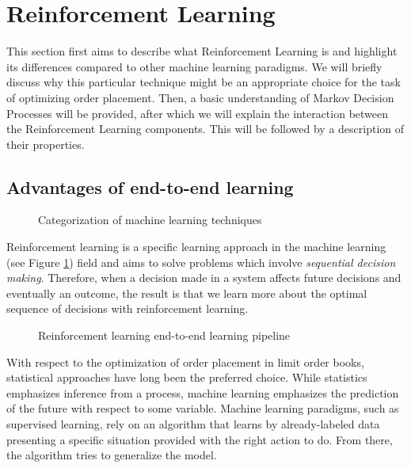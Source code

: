 \section{Reinforcement Learning}
\label{sec:reinforcement-learning}

This section first aims to describe what Reinforcement Learning is and highlight its differences compared to other machine learning paradigms. 
We will briefly discuss why this particular technique might be an appropriate choice for the task of optimizing order placement. 
Then, a basic understanding of Markov Decision Processes will be provided, after which we will explain the interaction between the Reinforcement Learning components. This will be followed by a description of their properties.

\subsection{Advantages of end-to-end learning}

\begin{figure}[H]
    \centering
    \caption{Categorization of machine learning techniques}
    \label{fig:ml-rl}
\end{figure}

Reinforcement learning is a specific learning approach in the machine learning (see Figure \ref{fig:ml-rl}) field and aims to solve problems which involve \textit{sequential decision making}.
Therefore, when a decision made in a system affects future decisions and eventually an outcome, the result is that we learn more about the optimal sequence of decisions with reinforcement learning.

\begin{figure}[H]
    \centering
    \caption{Reinforcement learning end-to-end learning pipeline}
    \label{fig:rl-pipeline}
\end{figure}

With respect to the optimization of order placement in limit order books, statistical approaches have long been the preferred choice.
While statistics emphasizes inference from a process, machine learning emphasizes the prediction of the future with respect to some variable.
Machine learning paradigms, such as supervised learning, rely on an algorithm that learns by already-labeled data presenting a specific situation provided with the right action to do. 
From there, the algorithm tries to generalize the model.

